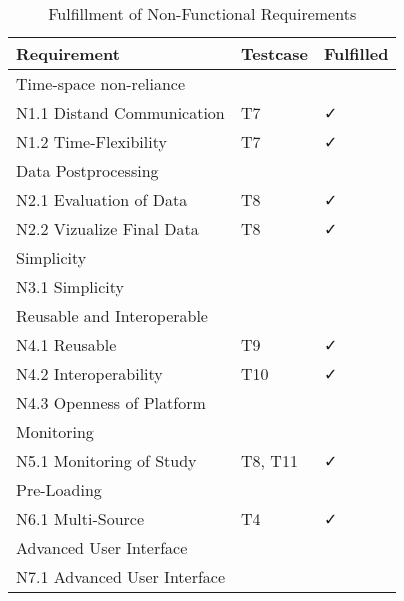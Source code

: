 \begin{table}
    \centering
    \small
    \begin{tabular}{L{0.35\textwidth}C{0.19\textwidth}C{0.19\textwidth}}
    \hline
Requirement                             & Testcase & Fulfilled  \\ \hline
    Time-space non-reliance     &   &          \\ \hline
    N1.1 Distand Communication      & T7 & \faCheck           \\
    N1.2 Time-Flexibility           & T7 & \faCheck            \\ \hline
    Data Postprocessing &      &       \\ \hline
    N2.1 Evaluation of Data         &  T8 &   \faCheck          \\
    N2.2 Vizualize Final Data       & T8 &  \faCheck         \\ \hline
    Simplicity                  &    &        \\ \hline
    N3.1 Simplicity                 &  &        \\\hline
    Reusable and Interoperable  &       &      \\ \hline
    N4.1 Reusable                   & T9 &  \faCheck         \\
    N4.2 Interoperability           & T10 &  \faCheck        \\
    N4.3 Openness of Platform       & &  \\\hline
    Monitoring                  &  &           \\ \hline
    N5.1 Monitoring of Study        & T8, T11 &  \faCheck         \\ \hline
    Pre-Loading                 &     &        \\ \hline
    N6.1 Multi-Source             & T4 &  \faCheck          \\ \hline
    Advanced User Interface   &    &         \\ \hline
    N7.1 Advanced User Interface  & &          \\ \hline
    \end{tabular}
    \caption[Fulfillment of Non-Functional Requirements]{Fulfillment of Non-Functional Requirements}\label{tab:NonFuncRequirementsCatCheck}
    \end{table}



